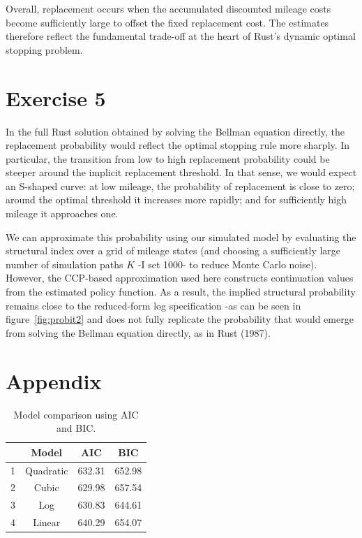 \documentclass{article}
\begin{document}
Overall, replacement occurs when the accumulated discounted mileage costs become sufficiently large to offset the fixed replacement cost. The estimates therefore reflect the fundamental trade-off at the heart of Rust’s dynamic optimal stopping problem.

\section*{Exercise 5}

In the full Rust solution obtained by solving the Bellman equation directly, the replacement probability would reflect the optimal stopping rule more sharply. In particular, the transition from low to high replacement probability could be steeper around the implicit replacement threshold. In that sense, we would expect an S-shaped curve: at low mileage, the probability of replacement is close to zero; around the optimal threshold it increases more rapidly; and for sufficiently high mileage it approaches one.

We can approximate this probability using our simulated model by evaluating the structural index over a grid of mileage states (and choosing a sufficiently large number of simulation paths $K$ -I set 1000- to reduce Monte Carlo noise). However, the CCP-based approximation used here constructs continuation values from the estimated policy function. As a result, the implied structural probability remains close to the reduced-form log specification -as can be seen in figure~\ref{fig:probit2} and does not fully replicate the probability that would emerge from solving the Bellman equation directly, as in Rust (1987).


\section*{Appendix}

\begin{table}[H]
\centering

\caption{Model comparison probit specifications.}
\label{tab:modelprobit}
\end{table}


\begin{table}[H]
\centering
\begin{tabular}{r|ccc}
	& Model & AIC & BIC\\
	\hline
	1 & Quadratic & 632.31 & 652.98 \\
	2 & Cubic & 629.98 & 657.54 \\
	3 & Log & 630.83 & 644.61 \\
	4 & Linear & 640.29 & 654.07 \\
\end{tabular}
\caption{Model comparison using AIC and BIC.}
\label{tab:modelselect}
\end{table}
\end{document}
